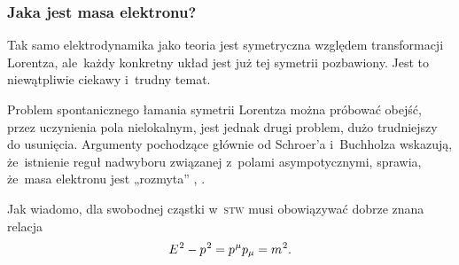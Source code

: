 \documentclass[10pt,t]{beamer}
\begin{document}
\begin{frame}
  \frametitle{Jaka jest masa elektronu?}


  Tak samo elektrodynamika jako teoria jest symetryczna względem
  transformacji Lorentza, ale~każdy konkretny układ jest już tej symetrii
  pozbawiony. Jest to niewątpliwie ciekawy i~trudny temat.

  Problem spontanicznego łamania symetrii Lorentza można próbować obejść,
  przez uczynienia pola nielokalnym, jest jednak drugi problem, dużo
  trudniejszy do usunięcia. Argumenty pochodzące głównie od Schroer’a
  i~Buchholza wskazują, że~istnienie reguł nadwyboru związanej z~polami
  asympotycznymi, sprawia, że~masa elektronu jest „rozmyta”
  \parencite{Schroer-Infraparticles-in-quantum-field-theory-Pub-1963},
  \parencite{Buchholz-The-Physical-State-Space-Of-Quantum-ETC-Pub-1982}.

  Jak wiadomo, dla swobodnej cząstki w~\textsc{stw} musi obowiązywać
  dobrze znana relacja
  \begin{equation}
    \label{eq:Glowne-rodzaje-problemow-podczerwonych-12}
    E^{ \hspace{0.05em} 2 } - p^{ \hspace{0.05em} 2 } =
    p^{ \hspace{0.05em} \mu } p_{ \mu }  = m^{ \hspace{0.05em} 2 }.
  \end{equation}


\end{frame}
\end{document}

